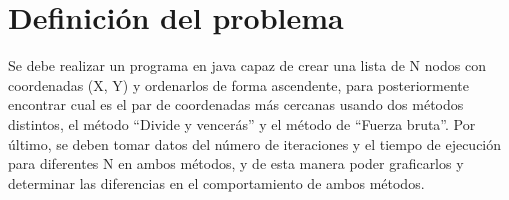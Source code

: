 \section{Definición del problema}

Se debe realizar un programa en java capaz de crear una lista de N nodos con coordenadas (X, Y) y ordenarlos de forma ascendente, para posteriormente encontrar cual es el par de coordenadas más cercanas usando dos métodos distintos, el método “Divide y vencerás” y el método de “Fuerza bruta”. Por último, se deben tomar datos del número de iteraciones y el tiempo de ejecución para diferentes N en ambos métodos, y de esta manera poder graficarlos y determinar las diferencias en el comportamiento de ambos métodos.